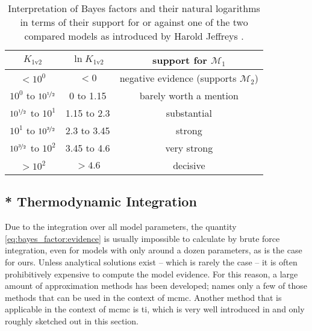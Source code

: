 \documentclass[\relativeRoot/main.tex]{subfiles}
\begin{document}
\begin{table}
    \centering
    \begin{tabular}{ | c | c | c | }
        \hline
        $K_\text{1v2}$ & $\ln{K_\text{1v2}}$ & support for $\mathcal{M}_1$ \\
        \hline
        $< 10^0$ & $< 0$ & negative evidence (supports $\mathcal{M}_2$) \\
        $10^0$ to $10^{\nicefrac{1}{2}}$ & 0 to 1.15 & barely worth a mention \\
        $10^{\nicefrac{1}{2}}$ to $10^1$ & 1.15 to 2.3 & substantial \\
        $10^1$ to $10^{\nicefrac{3}{2}}$ & 2.3 to 3.45 & strong \\
        $10^{\nicefrac{3}{2}}$ to $10^2$ & 3.45 to 4.6 & very strong \\
        $> 10^2$ & $> 4.6$ & decisive \\
        \hline
    \end{tabular}
    \caption[Interpretation of ranges of Bayes factors]{Interpretation of Bayes factors and their natural logarithms in terms of their support for or against one of the two compared models as introduced by Harold Jeffreys \cite{jeffreys_theory_1998}.}
    \label{table:bayes_factor}
\end{table}

\subsection{* Thermodynamic Integration}
\label{subsec:graph:model_comp:thermo_int}

Due to the integration over all model parameters, the quantity \cref{eq:bayes_factor:evidence} is usually impossible to calculate by brute force integration, even for models with only around a dozen parameters, as is the case for ours. Unless analytical solutions exist -- which is rarely the case -- it is often prohibitively expensive to compute the model evidence. For this reason, a large amount of approximation methods has been developed; \cite{friel_estimating_2011} names only a few of those methods that can be used in the context of \gls{mcmc}. Another method that is applicable in the context of \gls{mcmc} is \gls{ti}, which is very well introduced in \cite{aponte_introduction_2022} and only roughly sketched out in this section.
\end{document}

